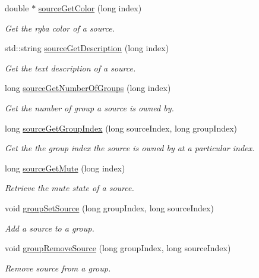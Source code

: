 \begin{DoxyCompactItemize}
double $\ast$ \hyperlink{class_hoa2_d_1_1_sources_manager_a6784921b44c8f960707cb29fab9fa109}{source\-Get\-Color} (long index)
\begin{DoxyCompactList}\small\item\em Get the rgba color of a source. \end{DoxyCompactList}\item 
std\-::string \hyperlink{class_hoa2_d_1_1_sources_manager_af8284c5856ed2cf12bac19c3fbf6a69d}{source\-Get\-Description} (long index)
\begin{DoxyCompactList}\small\item\em Get the text description of a source. \end{DoxyCompactList}\item 
long \hyperlink{class_hoa2_d_1_1_sources_manager_a529158e6be59a88f07400aa357d8d4d9}{source\-Get\-Number\-Of\-Groups} (long index)
\begin{DoxyCompactList}\small\item\em Get the number of group a source is owned by. \end{DoxyCompactList}\item 
long \hyperlink{class_hoa2_d_1_1_sources_manager_aadd7e73f5cebe599872ed486aaafecca}{source\-Get\-Group\-Index} (long source\-Index, long group\-Index)
\begin{DoxyCompactList}\small\item\em Get the the group index the source is owned by at a particular index. \end{DoxyCompactList}\item 
long \hyperlink{class_hoa2_d_1_1_sources_manager_a24b1b5792ef4694e3e5d505461bcf1f8}{source\-Get\-Mute} (long index)
\begin{DoxyCompactList}\small\item\em Retrieve the mute state of a source. \end{DoxyCompactList}\item 
void \hyperlink{class_hoa2_d_1_1_sources_manager_a081a6d30f97980018607462f97dad042}{group\-Set\-Source} (long group\-Index, long source\-Index)
\begin{DoxyCompactList}\small\item\em Add a source to a group. \end{DoxyCompactList}\item 
void \hyperlink{class_hoa2_d_1_1_sources_manager_ac78e60e371ab6c7056b7397367fb8dcf}{group\-Remove\-Source} (long group\-Index, long source\-Index)
\begin{DoxyCompactList}\small\item\em Remove source from a group. \end{DoxyCompactList}\item 

\end{DoxyCompactItemize}
